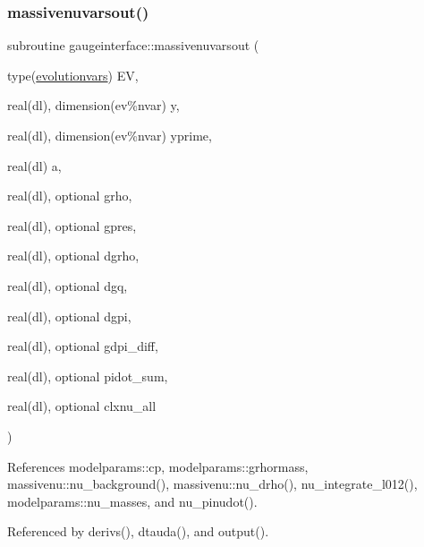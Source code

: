\subsubsection{\texorpdfstring{massivenuvarsout()}{massivenuvarsout()}}
{\footnotesize\ttfamily subroutine gaugeinterface\+::massivenuvarsout (\begin{DoxyParamCaption}\item[{type(\mbox{\hyperlink{structgaugeinterface_1_1evolutionvars}{evolutionvars}})}]{EV,  }\item[{real(dl), dimension(ev\%nvar)}]{y,  }\item[{real(dl), dimension(ev\%nvar)}]{yprime,  }\item[{real(dl)}]{a,  }\item[{real(dl), optional}]{grho,  }\item[{real(dl), optional}]{gpres,  }\item[{real(dl), optional}]{dgrho,  }\item[{real(dl), optional}]{dgq,  }\item[{real(dl), optional}]{dgpi,  }\item[{real(dl), optional}]{gdpi\+\_\+diff,  }\item[{real(dl), optional}]{pidot\+\_\+sum,  }\item[{real(dl), optional}]{clxnu\+\_\+all }\end{DoxyParamCaption})}



References modelparams\+::cp, modelparams\+::grhormass, massivenu\+::nu\+\_\+background(), massivenu\+::nu\+\_\+drho(), nu\+\_\+integrate\+\_\+l012(), modelparams\+::nu\+\_\+masses, and nu\+\_\+pinudot().



Referenced by derivs(), dtauda(), and output().

